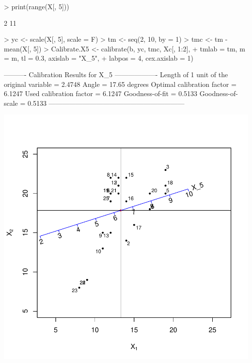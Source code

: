 \documentclass[a4paper]{article}
\begin{document}
\begin{Schunk}
\begin{Sinput}
> print(range(X[, 5]))
\end{Sinput}
\begin{Soutput}
[1]  2 11
\end{Soutput}
\begin{Sinput}
> yc <- scale(X[, 5], scale = F)
> tm <- seq(2, 10, by = 1)
> tmc <- tm - mean(X[, 5])
> Calibrate.X5 <- calibrate(b, yc, tmc, Xc[, 1:2], 
+     tmlab = tm, m = m, tl = 0.3, axislab = "X_5", 
+     labpos = 4, cex.axislab = 1)
\end{Sinput}
\begin{Soutput}
---------- Calibration Results for  X_5  -------------------
Length of 1 unit of the original variable =  2.4748  
Angle                                     =  17.65 degrees
Optimal calibration factor                =  6.1247  
Used calibration factor                   =  6.1247  
Goodness-of-fit                           =  0.5133  
Goodness-of-scale                         =  0.5133  
------------------------------------------------------------
\end{Soutput}
\end{Schunk}
\includegraphics{CalibrationGuide-006}
\end{document}
